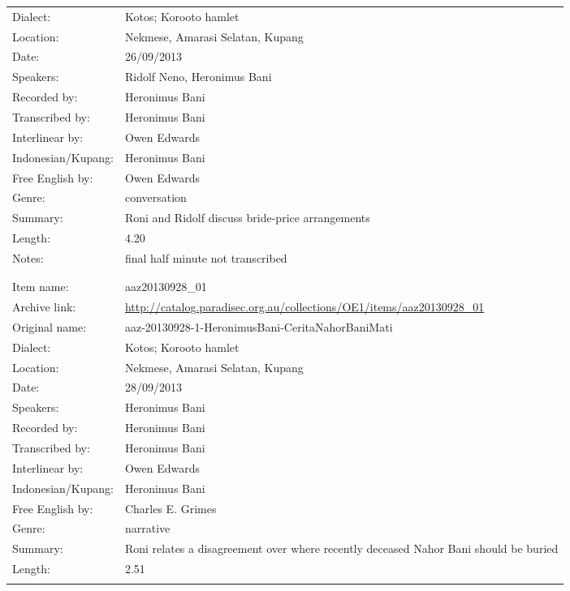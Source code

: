 \begin{longtable}{lL{.67\textwidth}}
Dialect:				& Kotos; Koro{\Q}oto hamlet \\
Location:				& Nekmese{\Q}, Amarasi Selatan, Kupang \\
Date:				& 26/09/2013\\
Speakers:				& Ridolf Neno, Heronimus Bani\\
Recorded by:			& Heronimus Bani\\
Transcribed by:		& Heronimus Bani\\
Interlinear by:		& Owen Edwards \\
Indonesian/Kupang:		& Heronimus Bani\\
Free English by:		& Owen Edwards\\
Genre:				& conversation\\
Summary:				& Roni and Ridolf discuss bride-price arrangements\\
Length:				& 4.20\\
Notes:				& final half minute not transcribed\\ \lspbottomrule
							& \\ \hhline{~}
			& \\
Item name:			& aaz20130928{\_}01\\
Archive link:			& \url{http://catalog.paradisec.org.au/collections/OE1/items/aaz20130928_01}\\
Original name:			& {\small aaz-20130928-1-HeronimusBani-CeritaNahorBaniMati}\\
Dialect:				& Kotos; Koro{\Q}oto hamlet \\
Location:				& Nekmese{\Q}, Amarasi Selatan, Kupang \\
Date:				& 28/09/2013\\
Speakers:				& Heronimus Bani\\
Recorded by:			& Heronimus Bani\\
Transcribed by:		& Heronimus Bani\\
Interlinear by:		& Owen Edwards \\
Indonesian/Kupang:		& Heronimus Bani\\
Free English by:		& Charles E. Grimes\\
Genre:				& narrative\\
Summary:				& Roni relates a disagreement over where recently
						deceased Nahor Bani should be buried\\
Length:				& 2.51\\ \lspbottomrule

\end{longtable}

